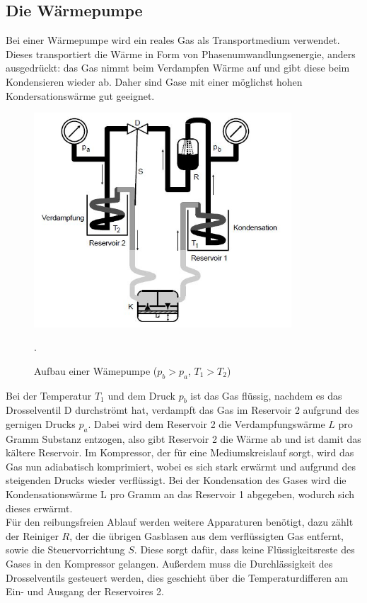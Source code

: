 \subsection{Die Wärmepumpe}
Bei einer Wärmepumpe wird ein reales Gas als Transportmedium verwendet. Dieses transportiert die
Wärme in Form von Phasenumwandlungsenergie, anders ausgedrückt: das Gas nimmt beim
Verdampfen Wärme auf und gibt diese beim Kondensieren wieder ab.
Daher sind Gase mit einer möglichst hohen Kondersationswärme gut geeignet.
\begin{figure}[H]
  \centering
  \includegraphics[height=8cm]{Pumpe.JPG}
  \caption{Aufbau einer Wämepumpe ($p_{b}>p_{a}$, $T_{1}>T_{2}$)}
  \cite{skript}.
  \label{fig:pumpe}
\end{figure}
Bei der Temperatur $T_{1}$ und dem Druck $p_{b}$ ist das Gas flüssig, nachdem es das Drosselventil D durchströmt
hat, verdampft das Gas im Reservoir 2 aufgrund des gernigen Drucks $p_{a}$. Dabei wird dem
Reservoir 2 die Verdampfungswärme $L$ pro Gramm Substanz entzogen, also gibt Reservoir 2 die Wärme ab und ist
damit das kältere Reservoir. Im Kompressor, der für eine Mediumskreislauf sorgt, wird das Gas nun
adiabatisch komprimiert, wobei es sich stark erwärmt und aufgrund des steigenden Drucks wieder verflüssigt.
Bei der Kondensation des Gases wird die Kondensationswärme L pro Gramm an das Reservoir 1 abgegeben, wodurch sich
dieses erwärmt.\\
Für den reibungsfreien Ablauf werden weitere Apparaturen benötigt, dazu zählt der Reiniger $R$, der
die übrigen Gasblasen aus dem verflüssigten Gas entfernt, sowie die Steuervorrichtung $S$.
Diese sorgt dafür, dass keine Flüssigkeitsreste des Gases in den Kompressor gelangen.
Außerdem muss die Durchlässigkeit des Drosselventils gesteuert werden, dies geschieht über
die Temperaturdifferen am Ein- und Ausgang der Reservoires 2.

